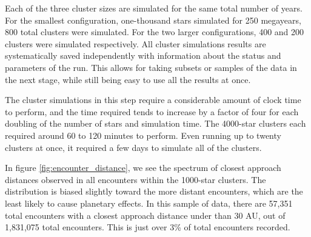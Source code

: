 \documentclass[12pt]{article}
\begin{document}
    Each of the three cluster sizes are simulated for the same total number of years.
    For the smallest configuration, one-thousand stars simulated for 250 megayears, 
    800 total clusters were simulated. For the two larger configurations, 400 and 200
    clusters were simulated respectively. All cluster simulations results are systematically 
    saved independently with information about the status and parameters of the run.
    This allows for taking subsets or samples of the data in the next stage, while still
    being easy to use all the results at once.

    The cluster simulations in this step require a considerable amount of clock time to perform,
    and the time required tends to increase by a factor of four for each doubling of the
    number of stars and simulation time. The 4000-star clusters each required around 60 to 120 minutes
    to perform. Even running up to twenty clusters at once, it required a few days to 
    simulate all of the clusters.

    In figure \ref{fig:encounter_distance}, we see the spectrum of closest approach
    distances observed in all encounters within the 1000-star clusters. The
    distribution is biased slightly toward the more distant encounters, which
    are the least likely to cause planetary effects. In this sample of data, there are
    57,351 total encounters with a closest approach distance under than 30 AU, 
    out of 1,831,075 total encounters. 
    This is just over 3\% of total encounters recorded.
\end{document}
